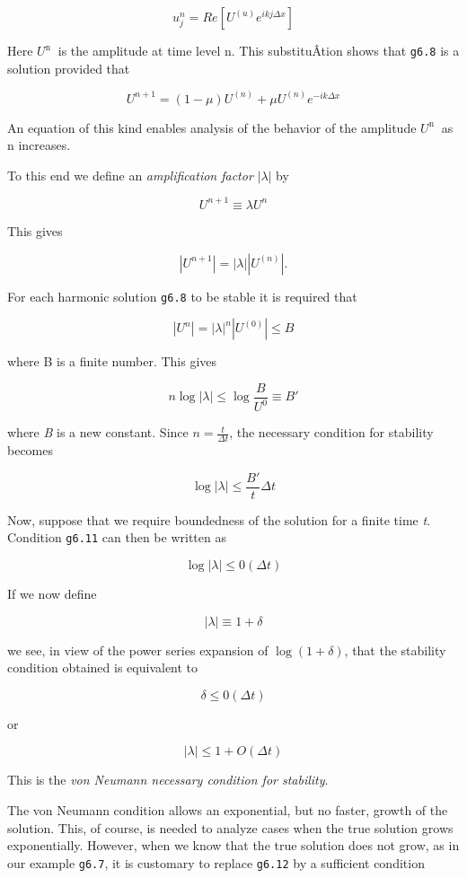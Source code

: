 {\[u_{j}^{n} = Re \left\lbrack U^{\left( u \right)}e^{ikj\Delta x} \right\rbrack\]}

Here \(U^{\text{n }}\) is the amplitude at time level n. This
substituÂ­tion shows that \texttt{g6.8} is a solution provided that

{\[U^{n + 1} = \left( 1 - \mu \right)U^{\left( n \right)}  + \mu U^{\left( n \right)}e^{- ik\Delta x}\]}

An equation of this kind enables analysis of the behavior of the
amplitude \(U^{\text{n }}\) as n increases.

To this end we define an \emph{amplification factor}
\(\left| \lambda \right|\) by

{\[U^{n + 1} \equiv \lambda U^{n}\]}

This gives

\[|U^{n + 1}| = |\lambda | | U^{(n)} |.\]

For each harmonic solution \texttt{g6.8} to be stable it is required
that

\[|U^{n}| =|\lambda |^n | U^{(0)} | \leq B\]

where B is a finite number. This gives

\[n\log |\lambda | \leq \log \frac{B}{U^0} \equiv B'\]

where \emph{B\textquotesingle{}} is a new constant. Since
\(n = \frac{t}{\Delta t}\), the necessary condition for stability
becomes

{\[\log |\lambda | \leq \frac{B'}{t} \Delta t\]}

Now, suppose that we require boundedness of the solution for a finite
time \emph{t}. Condition \texttt{g6.11} can then be written as

\[\log|\lambda| \leq 0( \Delta t )\]

If we now define

\[\left| \lambda \right| \equiv 1 + \delta\]

we see, in view of the power series expansion of
\(\log\left( 1 + \delta \right)\), that the stability condition obtained
is equivalent to

\[\delta \leq 0\left( \Delta t \right)\]

or

{\[|\lambda| \leq 1 + O (\Delta t)\]}

This is the \emph{von Neumann necessary condition for stability}.

The von Neumann condition allows an exponential, but no faster, growth
of the solution. This, of course, is needed to analyze cases when the
true solution grows exponentially. However, when we know that the true
solution does not grow, as in our example \texttt{g6.7}, it is customary
to replace \texttt{g6.12} by a sufficient condition

